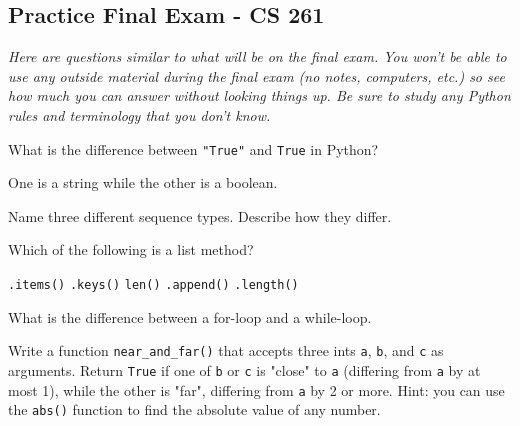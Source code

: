 \documentclass[12pt]{exam}
\begin{document}
\pagestyle{empty}
\graphicspath{{/home/brian/Dropbox/HSC/Spring16/Math111/}}

\subsection*{Practice Final Exam - CS 261}
\textit{Here are questions similar to what will be on the final exam.  You won't be able to use any outside material during the final exam (no notes, computers, etc.) so see how much you can answer without looking things up. Be sure to study any Python rules and terminology that you don't know. }

\begin{questions}

\question What is the difference between \verb|"True"| and \verb|True| in Python? 
\begin{solution}
One is a string while the other is a boolean. 
\end{solution}

\question Name three different sequence types. Describe how they differ.

\question Which of the following is a list method?
\begin{choices}
\choice \verb|.items()|
\choice \verb|.keys()|
\choice \verb|len()|
\CorrectChoice \verb|.append()|
\choice \verb|.length()|
\end{choices}

\question What is the difference between a for-loop and a while-loop.  

\question Write a function \verb|near_and_far()| that accepts three ints \verb|a|, \verb|b|, and \verb|c| as arguments. Return \verb|True| if one of \verb|b| or \verb|c| is "close" to \verb|a| (differing from \verb|a| by at most 1), while the other is "far", differing from \verb|a| by 2 or more. Hint: you can use the \verb|abs()| function to find the absolute value of any number.  

\question 

\end{questions}
\end{document}
